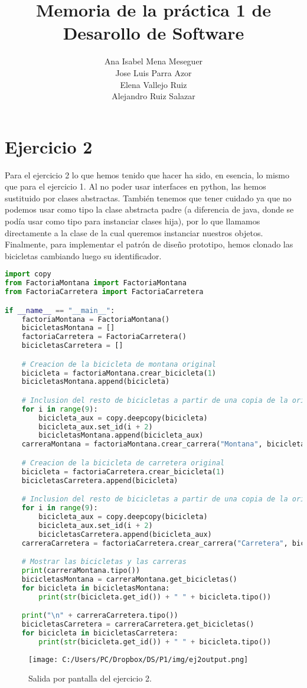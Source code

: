 \documentclass{article}
\title{Memoria de la práctica 1 de Desarollo de Software}
\author{Ana Isabel Mena Meseguer \\ Jose Luis Parra Azor\\ Elena Vallejo Ruiz \\ Alejandro Ruiz Salazar}
\date{}
\begin{document}
\maketitle
\section{Ejercicio 2}
Para el ejercicio 2 lo que hemos tenido que hacer ha sido, en esencia, lo mismo que para el ejercicio 1. Al no poder usar interfaces en python, las hemos sustituido por clases abstractas. También tenemos que tener cuidado ya que no podemos usar como tipo la clase abstracta padre (a diferencia de java, donde se podía usar como tipo para instanciar clases hija), por lo que llamamos directamente a la clase de la cual queremos instanciar nuestros objetos. Finalmente, para implementar el patrón de diseño prototipo, hemos clonado las bicicletas cambiando luego su identificador. 
\begin{lstlisting}[language=Python, caption={main.py}]
import copy
from FactoriaMontana import FactoriaMontana
from FactoriaCarretera import FactoriaCarretera

if __name__ == "__main__":
    factoriaMontana = FactoriaMontana()
    bicicletasMontana = []
    factoriaCarretera = FactoriaCarretera()
    bicicletasCarretera = []

    # Creacion de la bicicleta de montana original
    bicicleta = factoriaMontana.crear_bicicleta(1)
    bicicletasMontana.append(bicicleta)

    # Inclusion del resto de bicicletas a partir de una copia de la original
    for i in range(9):
        bicicleta_aux = copy.deepcopy(bicicleta)
        bicicleta_aux.set_id(i + 2)
        bicicletasMontana.append(bicicleta_aux)
    carreraMontana = factoriaMontana.crear_carrera("Montana", bicicletasMontana)

    # Creacion de la bicicleta de carretera original
    bicicleta = factoriaCarretera.crear_bicicleta(1)
    bicicletasCarretera.append(bicicleta)

    # Inclusion del resto de bicicletas a partir de una copia de la original
    for i in range(9):
        bicicleta_aux = copy.deepcopy(bicicleta)
        bicicleta_aux.set_id(i + 2)
        bicicletasCarretera.append(bicicleta_aux)
    carreraCarretera = factoriaCarretera.crear_carrera("Carretera", bicicletasCarretera)

    # Mostrar las bicicletas y las carreras
    print(carreraMontana.tipo())
    bicicletasMontana = carreraMontana.get_bicicletas()
    for bicicleta in bicicletasMontana:
        print(str(bicicleta.get_id()) + " " + bicicleta.tipo())

    print("\n" + carreraCarretera.tipo())
    bicicletasCarretera = carreraCarretera.get_bicicletas()
    for bicicleta in bicicletasCarretera:
        print(str(bicicleta.get_id()) + " " + bicicleta.tipo())   
\end{lstlisting}
\begin{figure}[H]
\centering
\texttt{[image: C:/Users/PC/Dropbox/DS/P1/img/ej2output.png]}
\caption{Salida por pantalla del ejercicio 2.}
\end{figure}
\end{document}
